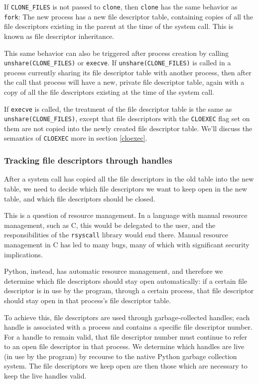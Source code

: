 \documentclass[letterpaper,twocolumn,10pt]{article}
\begin{document}
If \verb|CLONE_FILES| is not passed to \texttt{clone},
then \texttt{clone} has the same behavior as \texttt{fork}:
The new process has a new file descriptor table,
containing copies of all the file descriptors existing in the parent at the time of the system call.
This is known as file descriptor inheritance.

This same behavior can also be triggered after process creation by calling \verb|unshare(CLONE_FILES)| or \texttt{execve}.
If \verb|unshare(CLONE_FILES)|
is called in a process currently sharing its file descriptor table with another process,
then after the call that process will have a new, private file descriptor table,
again with a copy of all the file descriptors existing at the time of the system call.

If \texttt{execve} is called,
the treatment of the file descriptor table is the same as \verb|unshare(CLONE_FILES)|,
except that file descriptors with the \texttt{CLOEXEC} flag set on them
are not copied into the newly created file descriptor table.
We'll discuss the semantics of \texttt{CLOEXEC} more in section \ref{cloexec}.
\subsubsection{Tracking file descriptors through handles}
After a system call has copied all the file descriptors in the old table into the new table,
we need to decide which file descriptors we want to keep open in the new table,
and which file descriptors should be closed.

This is a question of resource management.
In a language with manual resource management,
such as C,
this would be delegated to the user,
and the responsibilities of the \texttt{rsyscall} library would end there.
Manual resource management in C has led to many bugs,
many of which with significant security implications.

Python, instead, has automatic resource management,
and therefore we determine which file descriptors should stay open automatically:
if a certain file descriptor is in use by the program,
through a certain process,
that file descriptor should stay open in that process's file descriptor table.

To achieve this, file descriptors are used through garbage-collected handles;
each handle is associated with a process and contains a specific file descriptor number.
For a handle to remain valid,
that file descriptor number must continue to refer to an open file descriptor in that process.
We determine which handles are live (in use by the program)
by recourse to the native Python garbage collection system.
The file descriptors we keep open are then those which are necessary to keep the live handles valid.
\end{document}
